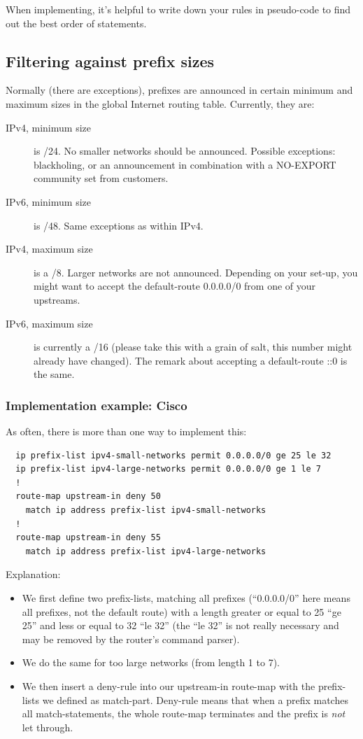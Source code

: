 When implementing, it's helpful to write down your rules in pseudo-code to find out the best order of statements.

\subsection{Filtering against prefix sizes}
Normally (there are exceptions), prefixes are announced in certain minimum and maximum sizes in the global Internet routing table. Currently, they are:
\begin{description}
  \item[IPv4, minimum size] is /24. No smaller networks should be announced. Possible exceptions: \Gls{blackholing}, or an announcement in combination with a NO-EXPORT community set from customers.
  \item[IPv6, minimum size] is /48. Same exceptions as within IPv4.
  \item[IPv4, maximum size] is a /8. Larger networks are not announced. Depending on your set-up, you might want to accept the \gls{default-route} 0.0.0.0/0 from one of your upstreams.
  \item[IPv6, maximum size] is currently a /16 (please take this with a grain of salt, this number might already have changed). The remark about accepting a \gls{default-route} ::0 is the same.
\end{description}

\subsubsection{Implementation example: Cisco}
As often, there is more than one way to implement this:
\begin{verbatim}
  ip prefix-list ipv4-small-networks permit 0.0.0.0/0 ge 25 le 32
  ip prefix-list ipv4-large-networks permit 0.0.0.0/0 ge 1 le 7
  !
  route-map upstream-in deny 50
    match ip address prefix-list ipv4-small-networks
  !
  route-map upstream-in deny 55
    match ip address prefix-list ipv4-large-networks
\end{verbatim}
Explanation:
\begin{itemize}
  \item We first define two prefix-lists, matching all prefixes (``0.0.0.0/0'' here means all prefixes, not the default route) with a length greater or equal to 25 ``ge 25'' and less or equal to 32 ``le 32'' (the ``le 32'' is not really necessary and may be removed by the router's command parser).
  \item We do the same for too large networks (from length 1 to 7).
  \item We then insert a deny-rule into our upstream-in route-map with the prefix-lists we defined as match-part. Deny-rule means that when a prefix matches all match-statements, the whole route-map terminates and the prefix is \emph{not} let through.
\end{itemize}

